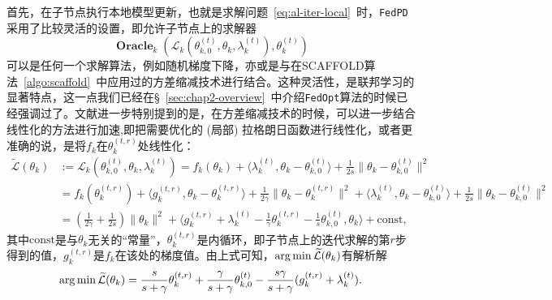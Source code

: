 首先，在子节点执行本地模型更新，也就是求解问题~\eqref{eq:al-iter-local}~时，\texttt{FedPD}采用了比较灵活的设置，即允许子节点上的求解器
\begin{equation*}
\operatorname{\mathbf{Oracle}}_k(\mathcal{L}_k(\theta_{k, 0}^{(t)}, \theta_k, \lambda_k^{(t)}), \theta_k^{(t)})
\end{equation*}
可以是任何一个求解算法，例如随机梯度下降，亦或是与在SCAFFOLD算法~\ref{algo:scaffold}~中应用过的方差缩减技术进行结合。这种灵活性，是联邦学习的显著特点，这一点我们已经在\S~\ref{sec:chap2-overview}~中介绍\texttt{FedOpt}算法的时候已经强调过了。文献\parencite{zhang2020fedpd}进一步特别提到的是，在方差缩减技术的时候，可以进一步结合线性化的方法进行加速,即把需要优化的 (局部) 拉格朗日函数进行线性化，或者更准确的说，是将$f_k$在$\theta_{k}^{(t,r)}$处线性化：
\begin{equation*}
\begin{aligned}
\widetilde{\mathcal{L}}(\theta_{k}) & := \mathcal{L}_k(\theta_{k, 0}^{(t)}, \theta_k, \lambda_k^{(t)}) = f_k(\theta_k) + \langle \lambda_k^{(t)}, \theta_k - \theta_{k, 0}^{(t)} \rangle + \frac{1}{2s} \lVert \theta_k - \theta_{k, 0}^{(t)} \rVert^2 \\
& = f_k(\theta_k^{(t,r)}) + \langle g_k^{(t,r)}, \theta_k - \theta_k^{(t,r)} \rangle + \frac{1}{2\gamma} \lVert \theta_k - \theta_k^{(t,r)} \rVert^2 + \langle \lambda_k^{(t)}, \theta_k - \theta_{k, 0}^{(t)} \rangle + \frac{1}{2s} \lVert \theta_k - \theta_{k, 0}^{(t)} \rVert^2 \\
& = (\frac{1}{2\gamma} + \frac{1}{2s}) \lVert \theta_k \rVert^2 + \langle g_k^{(t,r)} + \lambda_k^{(t)} - \frac{1}{\gamma} \theta_k^{(t,r)} - \frac{1}{s} \theta_{k, 0}^{(t)}, \theta_k \rangle + \text{const},
\end{aligned}
\end{equation*}
其中$\text{const}$是与$\theta_k$无关的``常量''，$\theta_{k}^{(t,r)}$是内循环，即子节点上的迭代求解的第$r$步得到的值，$g_k^{(t,r)}$是$f_k$在该处的梯度值。由上式可知，$\operatorname*{arg\,min} \widetilde{\mathcal{L}}(\theta_{k})$有解析解
\begin{equation*}
\operatorname*{arg\,min} \widetilde{\mathcal{L}}(\theta_{k}) = \frac{s}{s+\gamma} \theta_k^{(t,r)} + \frac{\gamma}{s+\gamma} \theta_{k, 0}^{(t)} - \frac{s\gamma}{s+\gamma}(g_k^{(t,r)} + \lambda_k^{(t)}).
\end{equation*}

